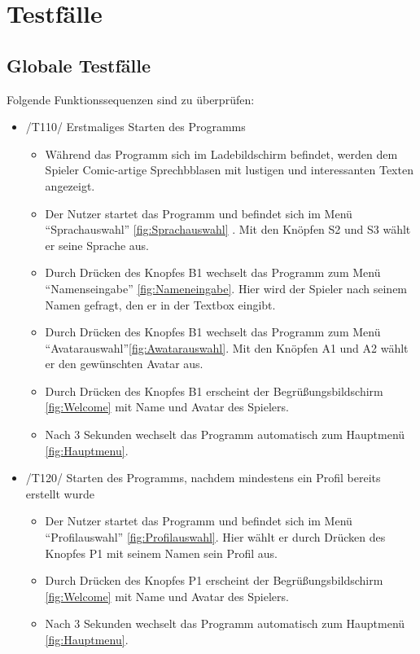 \section{Testfälle}


\subsection{Globale Testfälle}
Folgende Funktionssequenzen sind zu überprüfen:

\begin{itemize}
\item /T110/ Erstmaliges Starten des Programms
\begin{itemize}
\item Während das Programm sich im Ladebildschirm befindet, werden dem Spieler Comic-artige Sprechbblasen mit lustigen und interessanten Texten angezeigt.
\item Der Nutzer startet das Programm und befindet sich im Menü "`Sprachauswahl"'   \ref{fig:Sprachauswahl} . Mit den Knöpfen S2 und S3 wählt er seine Sprache aus.
\item Durch Drücken des Knopfes B1 wechselt das Programm zum Menü "`Namenseingabe"' \ref{fig:Nameneingabe}. Hier wird der Spieler nach seinem Namen gefragt, den er in der Textbox eingibt.
\item Durch Drücken des Knopfes B1 wechselt das Programm zum Menü "`Avatarauswahl"'\ref{fig:Awatarauswahl}.
 Mit den Knöpfen A1 und A2 wählt er den gewünschten Avatar aus.
\item Durch Drücken des Knopfes B1 erscheint der Begrüßungsbildschirm \ref{fig:Welcome} mit Name und Avatar des Spielers.
\item Nach 3 Sekunden wechselt das Programm automatisch zum Hauptmenü \ref{fig:Hauptmenu}.
\end{itemize}

\item /T120/ Starten des Programms, nachdem mindestens ein Profil bereits erstellt wurde
\begin{itemize}
\item Der Nutzer startet das Programm und befindet sich im Menü "`Profilauswahl"'
\ref{fig:Profilauswahl}. Hier wählt er durch Drücken des Knopfes P1 mit seinem Namen sein Profil aus.
\item Durch Drücken des Knopfes P1 erscheint der Begrüßungsbildschirm  \ref{fig:Welcome} mit Name und Avatar des Spielers.
\item Nach 3 Sekunden wechselt das Programm automatisch zum Hauptmenü \ref{fig:Hauptmenu}.
\end{itemize}


\end{itemize}

